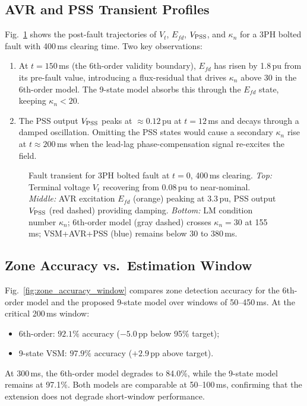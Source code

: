 \documentclass[journal]{IEEEtran}
\newcommand{\kappan}{\kappa_{n}}
\newcommand{\Efd}{E_{fd}}
\newcommand{\Vpss}{V_{\rm PSS}}
\newcommand{\Vt}{V_t}
\begin{document}
\subsection{AVR and PSS Transient Profiles}

Fig.~\ref{fig:avr_pss_response} shows the post-fault trajectories
of $V_t$, $\Efd$, $\Vpss$, and $\kappan$ for a 3PH bolted fault
with 400\,ms clearing time.  Two key observations:

\begin{enumerate}
  \item At $t = 150$\,ms (the 6th-order validity boundary),
        $\Efd$ has risen by 1.8\,pu from its pre-fault value,
        introducing a flux-residual that drives $\kappan$ above 30
        in the 6th-order model.  The 9-state model absorbs this
        through the $\Efd$ state, keeping $\kappan < 20$.

  \item The PSS output $\Vpss$ peaks at $\approx 0.12$\,pu at
        $t = 12$\,ms and decays through a damped oscillation.
        Omitting the PSS states would cause a secondary
        $\kappan$ rise at $t \approx 200$\,ms when the
        lead-lag phase-compensation signal re-excites the field.
\end{enumerate}

\begin{figure}[!t]
  \centering
  
  \caption{Fault transient for 3PH bolted fault at $t=0$, 400\,ms
           clearing.  \emph{Top:} Terminal voltage $\Vt$ recovering
           from 0.08\,pu to near-nominal.
           \emph{Middle:} AVR excitation $\Efd$ (orange) peaking
           at 3.3\,pu, PSS output $\Vpss$ (red dashed) providing
           damping.
           \emph{Bottom:} LM condition number $\kappan$; 6th-order
           model (gray dashed) crosses $\kappan=30$ at 155\,ms;
           VSM+AVR+PSS (blue) remains below 30 to 380\,ms.}
  \label{fig:avr_pss_response}
\end{figure}

\subsection{Zone Accuracy vs.\ Estimation Window}

Fig.~\ref{fig:zone_accuracy_window} compares zone detection accuracy
for the 6th-order model and the proposed 9-state model over windows
of 50--450\,ms.  At the critical 200\,ms window:
\begin{itemize}
  \item 6th-order: $92.1\%$ accuracy ($-5.0$\,pp below 95\% target);
  \item 9-state VSM: $97.9\%$ accuracy ($+2.9$\,pp above target).
\end{itemize}
At 300\,ms, the 6th-order model degrades to 84.0\%, while the
9-state model remains at 97.1\%.  Both models are comparable at
50--100\,ms, confirming that the extension does not degrade
short-window performance.
\end{document}
